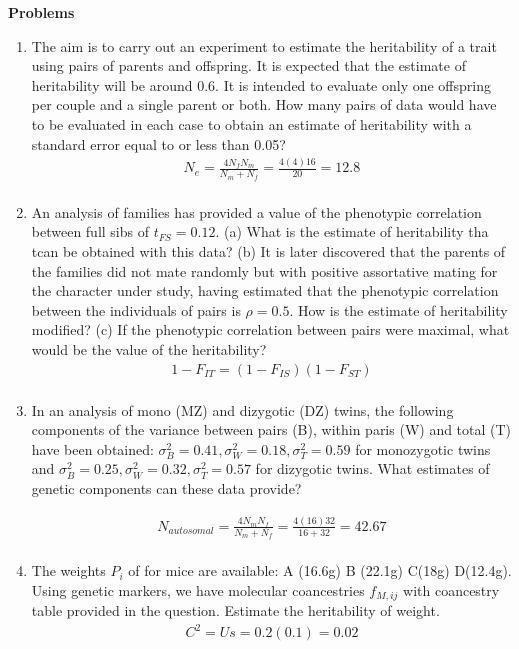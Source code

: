 \documentclass[12pt]{amsart}
\begin{document}
{\large \bf Problems}   
\begin{enumerate}
\item The aim is to carry out an experiment to estimate the heritability of a trait using pairs of parents and offspring. It is expected that the estimate of heritability will be around 0.6. It is intended to evaluate only one offspring per couple and a single parent or both. How many pairs of data would have to be evaluated in each case to obtain an estimate of heritability with a standard error equal to or less than 0.05?
\begin{gather*}
N_e = \frac{4N_fN_m}{N_m + N_f} = \frac{4(4)16}{20} = 12.8\\
\end{gather*}

\item An analysis of families has provided a value of the phenotypic correlation between full sibs of $t_{FS} = 0.12$. (a) What is the estimate of heritability tha tcan be obtained with this data? (b) It is later discovered that the parents of the families did not mate randomly but with positive assortative mating for the character under study, having estimated that the phenotypic correlation between the individuals of pairs is $\rho = 0.5$. How is the estimate of heritability modified? (c) If the phenotypic correlation between pairs were maximal, what would be the value of the heritability? 
\begin{gather*}
1 - F_{IT} = (1-F_{IS})(1-F_{ST}) \\
\end{gather*}

\item In an analysis of mono (MZ) and dizygotic (DZ) twins, the following components of the variance between pairs (B), within paris (W) and total (T) have been obtained: $\sigma^2_B = 0.41, \sigma^2_W = 0.18, \sigma^2_T = 0.59$ for monozygotic twins and $\sigma^2_B = 0.25, \sigma^2_W = 0.32, \sigma^2_T = 0.57$ for dizygotic twins. What estimates of genetic components can these data provide?

\begin{gather*}
N_{autosomal} = \frac{4N_mN_f}{N_m + N_f} = \frac{4(16)32}{16 + 32} =  42.67\\
\end{gather*}

\item The weights $P_i$ of for mice are available: A (16.6g) B (22.1g) C(18g) D(12.4g). Using genetic markers, we have molecular coancestries $f_{M, ij}$ with coancestry table provided in the question. Estimate the heritability of weight.
\begin{gather*}
C^2 = Us = 0.2(0.1) = 0.02\\
\end{gather*}


\end{enumerate}
\end{document}
